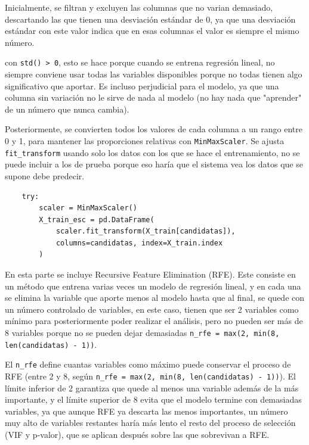 Inicialmente, se filtran y excluyen las columnas que no varian demasiado, descartando las que tienen una desviación estándar de 0, ya que una desviación estándar con este valor indica que en esas columnas el valor es siempre el mismo número.

con \texttt{std() > 0}, esto se hace porque cuando se entrena regresión lineal, no siempre conviene usar todas las variables disponibles porque no todas tienen algo significativo que aportar. Es incluso perjudicial para el modelo, ya que una columna sin variación no le sirve de nada al modelo (no hay nada que "aprender" de un número que nunca cambia).

Posteriormente, se convierten todos los valores de cada columna a un rango entre 0 y 1, para mantener las proporciones relativas con \texttt{MinMaxScaler}. Se ajusta \texttt{fit\_transform} usando solo los datos con los que se hace el entrenamiento, no se puede incluir a los de prueba porque eso haría que el sistema vea los datos que se supone debe predecir.  

\label{lst:regresion_escalado}
\begin{verbatim}
    try:
        scaler = MinMaxScaler()
        X_train_esc = pd.DataFrame(
            scaler.fit_transform(X_train[candidatas]),
            columns=candidatas, index=X_train.index
        )
\end{verbatim}

En esta parte se incluye Recursive Feature Elimination (RFE). Este consiste en un método que entrena varias veces un modelo de regresión lineal, y en cada una se elimina la variable que aporte menos al modelo hasta que al final, se quede con un número controlado de variables, en este caso, tienen que ser 2 variables como mínimo para posteriormente poder realizar el análisis, pero no pueden ser más de 8 variables porque no se pueden dejar demasiadas \texttt{n\_rfe = max(2, min(8, len(candidatas) - 1))}.

El \texttt{n\_rfe} define cuantas variables como máximo puede conservar el proceso de RFE (entre 2 y 8, según \texttt{n\_rfe = max(2, min(8, len(candidatas) - 1))}). El límite inferior de 2 garantiza que quede al menos una variable además de la más importante, y el límite superior de 8 evita que el modelo termine con demasiadas variables, ya que aunque RFE ya descarta las menos importantes, un número muy alto de variables restantes haría más lento el resto del proceso de selección (VIF y p-valor), que se aplican después sobre las que sobrevivan a RFE.

